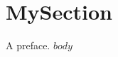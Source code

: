 \documentclass{template-uchile/tesis-uchile}
\begin{document}
\frontmatter

\tableofcontents
\mainmatter
\section*{MySection}
A preface.
$body$
\nocite{*} 
\printbibliography
\appendix
\end{document}
